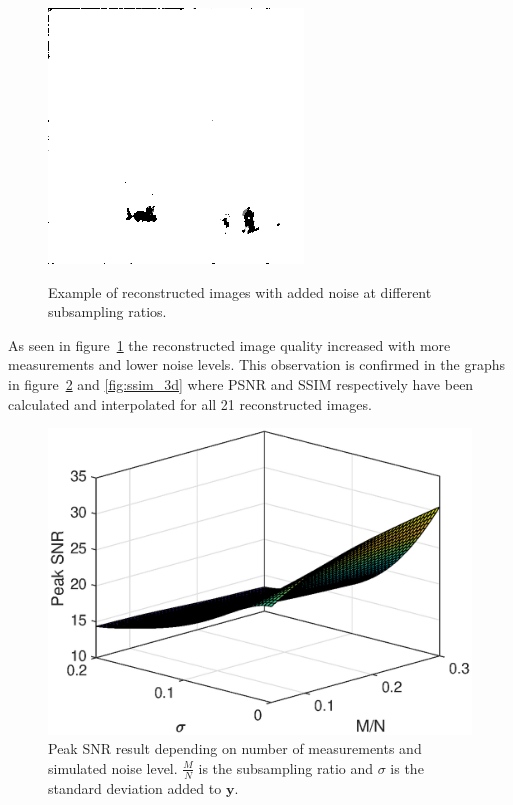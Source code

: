 \begin{figure}[H]
\begin{minipage}[t]{0.245\textwidth}
    \label{fig:noise_30_6}
    \includegraphics[width = \textwidth]{result/noisy/1_30_0.png}
    \label{fig:noise_30_0}
\end{minipage}
	\caption{Example of reconstructed images with added noise at different subsampling ratios.}
	\label{fig:noisy}
\end{figure}

As seen in figure~\ref{fig:noisy} the reconstructed image quality increased with more measurements and lower noise levels. This observation is confirmed in the graphs in figure~\ref{fig:psnr_3d} and \ref{fig:ssim_3d} where PSNR and SSIM respectively have been calculated and interpolated for all 21 reconstructed images. 

\begin{figure}[H]
    \centering
    \includegraphics[width = 0.7\linewidth]{result/synt_sss/PSNR_fit.eps}
    \caption{Peak SNR result depending on number of measurements and simulated noise level. $\frac{M}{N}$ is the subsampling ratio and $\sigma$ is the standard deviation added to $\mathbf{y}$.}
    \label{fig:psnr_3d}
\end{figure}


